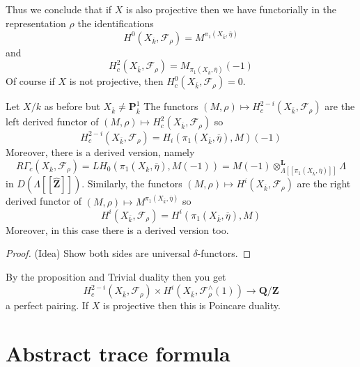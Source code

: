 \begin{remark}
\label{remark-projective}
Thus we conclude that if $X$ is also projective then
we have functorially in the representation $\rho$
the identifications
$$
H^0(X_{\overline{k}}, \mathcal{F}_\rho) =
M^{\pi_1(X_{\overline{k}}, \overline\eta)}
$$
and
$$
H_c^2(X_{\overline{k}}, \mathcal{F}_\rho) =
M_{\pi_1(X_{\overline{k}}, \overline \eta)}(-1)
$$
Of course if $X$ is not projective, then
$H^0_c(X_{\overline{k}}, \mathcal{F}_\rho) = 0$.
\end{remark}


\begin{proposition}
\label{proposition-curve-kpi1}
Let $X/k$ as before but $X_{\overline{k}}\neq \mathbf{P}^1_{\overline{k}}$
The functors
$
(M, \rho)\mapsto H_c^{2-i}(X_{\overline{k}}, \mathcal{F}_\rho)
$
are the left derived functor of
$(M, \rho)\mapsto H_c^2(X_{\overline{k}}, \mathcal{F}_\rho)$
so
$$
H_c^{2-i}(X_{\overline{k}}, \mathcal{F}_\rho) =
H_i(\pi_1(X_{\overline{k}}, \overline \eta), M)(-1)
$$
Moreover, there is a derived version, namely
$$
R\Gamma_c(X_{\overline{k}}, \mathcal{F}_\rho)
=
LH_0(\pi_1(X_{\overline{k}}, \overline \eta), M(-1))
=
M(-1)
\otimes_{\Lambda[[\pi_1(X_{\overline{k}}, \overline \eta)]]}^\mathbf{L}
\Lambda
$$
in $D(\Lambda[[\widehat{\mathbf{Z}}]])$.
Similarly, the functors
$(M, \rho)\mapsto H^i(X_{\overline{k}}, \mathcal{F}_\rho)$
are the right derived functor of
$(M, \rho)\mapsto M^{\pi_1(X_{\overline{k}}, \overline \eta)}$
so
$$
H^i(X_{\overline{k}}, \mathcal{F}_\rho) =
H^i(\pi_1(X_{\overline{k}}, \overline \eta), M)
$$
Moreover, in this case there is a derived version too.
\end{proposition}

\begin{proof}
(Idea) Show both sides are universal $\delta$-functors.
\end{proof}

\begin{remark}
\label{remark-poincare-groups}
By the proposition and Trivial duality then you get
$$
H^{2-i}_c(X_{\overline{k}}, \mathcal{F}_\rho)
\times
H^i(X_{\overline{k}}, \mathcal{F}_\rho^\wedge(1))
\to
\mathbf{Q}/\mathbf{Z}
$$
a perfect pairing. If $X$ is projective then this is Poincare duality.
\end{remark}





\section{Abstract trace formula}
\label{section-abstract-trace-formula}

